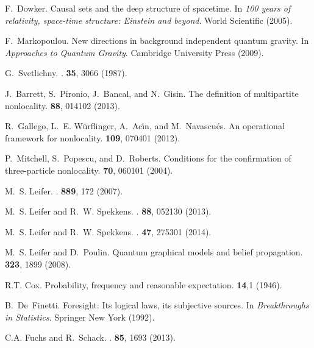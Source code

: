 \documentclass[12pt,onecolumn,nofootinbib]{revtex4-2}
\begin{document}
\begin{thebibliography}{10}
F.~Dowker.
\newblock Causal sets and the deep structure of spacetime.
\newblock In {\em {100 years of relativity, space-time
  structure: Einstein and beyond}}. World Scientific (2005).

F.~Markopoulou.
\newblock New directions in background independent quantum gravity.
\newblock In {\em Approaches to Quantum Gravity}. Cambridge University Press
  (2009).

G.~Svetlichny.
.
 \textbf{35}, 3066 (1987).

J.~Barrett, S.~Pironio, J.~Bancal, and N.~Gisin.
\newblock The definition of multipartite nonlocality.
 \textbf{88}, 014102 (2013).

R.~Gallego, L.~E. W{\"u}rflinger, A.~Ac{\'\i}n, and M.~Navascu{\'e}s.
\newblock An operational framework for nonlocality.
 \textbf{109}, 070401 (2012).

P.~Mitchell, S.~Popescu, and D.~Roberts.
\newblock Conditions for the confirmation of three-particle nonlocality.
 \textbf{70}, 060101 (2004).

M.~S. Leifer.
.
 \textbf{889}, 172 (2007).

M.~S. Leifer and R.~W. Spekkens.
.
 \textbf{88}, 052130 (2013).

M.~S. Leifer and R.~W. Spekkens.
.
 \textbf{47}, 275301 (2014).

M.~S. Leifer and D.~Poulin.
\newblock Quantum graphical models and belief propagation.
 \textbf{323}, 1899 (2008).

R.T. Cox.
\newblock Probability, frequency and reasonable expectation.
 \textbf{14},1 (1946).

B.~De~Finetti.
\newblock Foresight: Its logical laws, its subjective sources.
\newblock In {\em Breakthroughs in Statistics}. Springer New York (1992).

C.A. Fuchs and R.~Schack.
.
 \textbf{85}, 1693 (2013).

\end{thebibliography}
\end{document}
